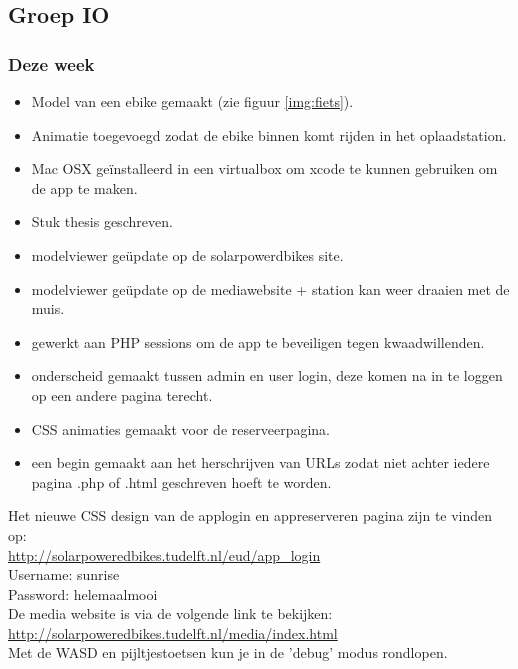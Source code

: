 \subsection*{Groep IO}

\subsubsection*{Deze week}
\begin{itemize}
\item Model van een ebike gemaakt (zie figuur \ref{img:fiets}).
\item Animatie toegevoegd zodat de ebike binnen komt rijden in het oplaadstation.
\item Mac OSX ge\"installeerd in een virtualbox om xcode te kunnen gebruiken om de app te maken.
\item Stuk thesis geschreven.
\item modelviewer ge\"update op de solarpowerdbikes site.
\item modelviewer ge\"update op de mediawebsite + station kan weer draaien met de muis.
\item gewerkt aan PHP sessions om de app te beveiligen tegen kwaadwillenden.
\item onderscheid gemaakt tussen admin en user login, deze komen na in te loggen op een andere pagina terecht.
\item CSS animaties gemaakt voor de reserveerpagina.
\item een begin gemaakt aan het herschrijven van URLs zodat niet achter iedere pagina .php of .html geschreven hoeft te worden.

\end{itemize}

\noindent Het nieuwe CSS design van de applogin en appreserveren pagina zijn te vinden op:\\ \url{http://solarpoweredbikes.tudelft.nl/eud/app_login}\\

\noindent Username: sunrise\\
\noindent Password: helemaalmooi\\

\noindent De media website is via de volgende link te bekijken:\\
\url{http://solarpoweredbikes.tudelft.nl/media/index.html}\\

\noindent Met de WASD en pijltjestoetsen kun je in de 'debug' modus rondlopen.


